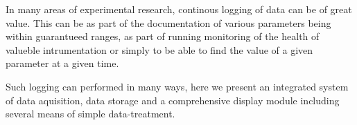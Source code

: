 In many areas of experimental research, continous logging of data can be of
great value. This can be as part of the documentation of various parameters
being within guarantueed ranges, as part of running monitoring of the health of
valueble intrumentation or simply to be able to find the value of a given
parameter at a given time.

Such logging can performed in many ways, here we present an integrated system
of data aquisition, data storage and a comprehensive display module including
several means of simple data-treatment.
